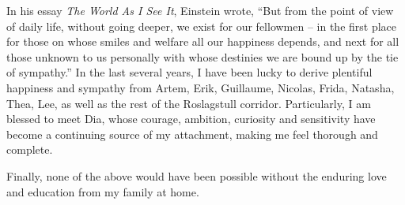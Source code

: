 \begin{acknowledgements}
  In his essay \emph{\small The World As I See It}, Einstein wrote,
  ``But from the point of view of daily life, without going deeper, we exist for our fellowmen --
  in the first place for those on whose smiles and welfare all our happiness depends,
  and next for all those unknown to us personally with whose destinies we are bound up by the tie of sympathy.''
  In the last several years, I have been lucky to derive plentiful happiness and sympathy from Artem, Erik, Guillaume, Nicolas, Frida, Natasha, Thea, Lee,
  as well as the rest of the Roslagstull corridor.
  Particularly, I am blessed to meet Dia, whose courage, ambition, curiosity and sensitivity have become a continuing source of my attachment,
  making me feel thorough and complete.
  
  Finally, none of the above would have been possible without the enduring love and education from my family at home.
  
  


  
  
\end{acknowledgements}
